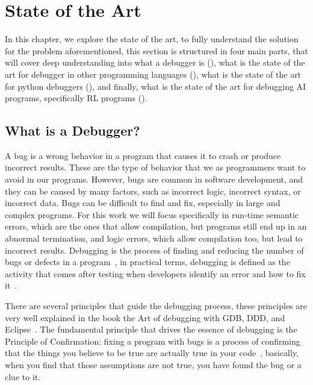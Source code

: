 
\section{State of the Art}
\label{sec:state_of_the_art}

In this chapter, we explore the state of the art, to fully understand the solution 
for the problem aforementioned, this section is structured in four main parts, that 
will cover deep understanding into what a debugger is (), what is the 
state of the art for debugger in other programming languages (), what 
is the state of the art for python debuggers (), and finally, what is the 
state of the art for debugging \ac{AI} programs, specifically \ac{RL} programs ().


\subsection{What is a Debugger?}
\label{sec:deb}
A bug is a wrong behavior in a program that causes it to crash or produce incorrect 
results. These are the type of behavior that we as programmers want to avoid in our
programs. However, bugs are common in software development, and they can be caused by 
many factors, such as incorrect logic, incorrect syntax, or incorrect data. Bugs can
be difficult to find and fix, especially in large and complex programs. For this work 
we will focus specifically in run-time semantic errors, which are the ones that allow 
compilation, but programs still end up in an abnormal termination, and logic 
errors, which allow compilation too, but lead to incorrect results. Debugging is the 
process of finding and reducing the number of 
bugs or defects in a program~\cite{hindriks12}, in practical terms, 
debugging is defined as the activity that comes after testing when developers identify 
an error and how to fix it~\cite{mccauley08}. 

There are several principles that guide the debugging process, these principles are 
very well explained in the book the Art of debugging with \ac{GDB}, \ac{DDD}, and Eclipse~\cite{matloff08}.
The fundamental principle that drives the essence of debugging is the Principle of 
Confirmation: fixing a program with bugs is a process of confirming that the things you believe
to be true are actually true in your code~\cite{matloff08}, basically, 
when you find that those assumptions are not true, you have found the bug or a clue to it.

